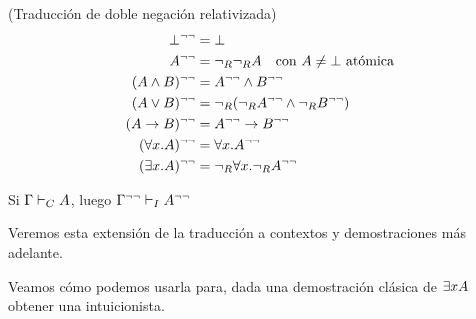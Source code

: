 \begin{definition}{(Traducción de doble negación relativizada)}
    \begin{align*}
        \bot^{\neg\neg} &= \bot\\
        A^{\neg\neg} &= \neg_R\neg_R A \quad \text{con $A \neq \bot$ atómica}\\
        (A \wedge B)^{\neg\neg} &= A^{\neg\neg} \wedge B^{\neg\neg}\\
        (A \vee B)^{\neg\neg} &= \neg_R(\neg_RA^{\neg\neg} \wedge \neg_RB^{\neg\neg})\\
        (A \rightarrow B)^{\neg\neg} &= A^{\neg\neg} \rightarrow B^{\neg\neg}\\
        (\forall x . A)^{\neg\neg} &= \forall x . A^{\neg\neg}\\
        (\exists x . A)^{\neg\neg} &= \neg_R \forall x . \neg_R A^{\neg\neg}
    \end{align*}
\end{definition}

\begin{theorem}
    Si $\Gamma \vdash_C A$, luego $\Gamma^{\neg\neg} \vdash_I A^{\neg\neg}$

    Veremos esta extensión de la traducción a contextos y demostraciones más adelante.
\end{theorem}

Veamos cómo podemos usarla para, dada una demostración clásica de $\exists x
A$ obtener una intuicionista.


